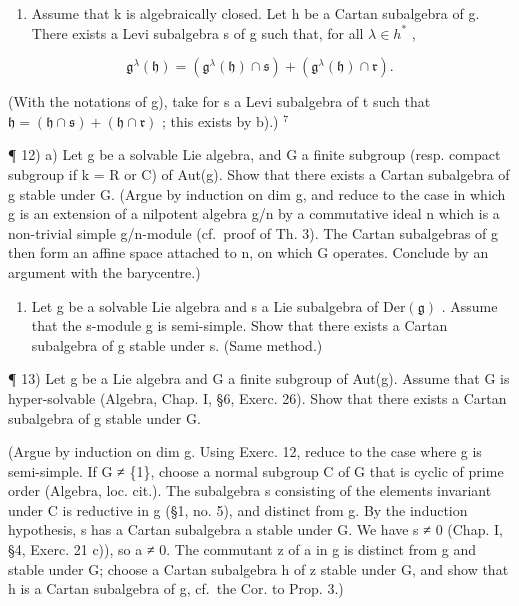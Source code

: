\begin{enumerate}
\def\labelenumi{\alph{enumi})}
\setcounter{enumi}{7}
\tightlist
\item
  Assume that k is algebraically closed. Let h be a Cartan subalgebra of g. There exists a Levi subalgebra s of g such that, for all \(\lambda \in h^{*}\) ,
\end{enumerate}

\[
\mathfrak {g} ^ {\lambda} (\mathfrak {h}) = \left(\mathfrak {g} ^ {\lambda} (\mathfrak {h}) \cap \mathfrak {s}\right) + \left(\mathfrak {g} ^ {\lambda} (\mathfrak {h}) \cap \mathfrak {r}\right).
\]

(With the notations of g), take for s a Levi subalgebra of t such that \(\mathfrak{h} = (\mathfrak{h} \cap \mathfrak{s}) + (\mathfrak{h} \cap \mathfrak{r})\) ; this exists by b).) \(^{7}\)

¶ 12) a) Let g be a solvable Lie algebra, and G a finite subgroup (resp. compact subgroup if k = R or C) of Aut(g). Show that there exists a Cartan subalgebra of g stable under G. (Argue by induction on dim g, and reduce to the case in which g is an extension of a nilpotent algebra g/n by a commutative ideal n which is a non-trivial simple g/n-module (cf.~proof of Th. 3). The Cartan subalgebras of g then form an affine space attached to n, on which G operates. Conclude by an argument with the barycentre.)

\begin{enumerate}
\def\labelenumi{\alph{enumi})}
\setcounter{enumi}{1}
\tightlist
\item
  Let g be a solvable Lie algebra and s a Lie subalgebra of \(\text{Der}(\mathfrak{g})\) . Assume that the s-module g is semi-simple. Show that there exists a Cartan subalgebra of g stable under s. (Same method.)
\end{enumerate}

¶ 13) Let g be a Lie algebra and G a finite subgroup of Aut(g). Assume that G is hyper-solvable (Algebra, Chap. I, §6, Exerc. 26). Show that there exists a Cartan subalgebra of g stable under G.

(Argue by induction on dim g. Using Exerc. 12, reduce to the case where g is semi-simple. If G ≠ \{1\}, choose a normal subgroup C of G that is cyclic of prime order (Algebra, loc. cit.). The subalgebra s consisting of the elements invariant under C is reductive in g (§1, no. 5), and distinct from g. By the induction hypothesis, s has a Cartan subalgebra a stable under G. We have s ≠ 0 (Chap. I, §4, Exerc. 21 c)), so a ≠ 0. The commutant z of a in g is distinct from g and stable under G; choose a Cartan subalgebra h of z stable under G, and show that h is a Cartan subalgebra of g, cf.~the Cor. to Prop. 3.)

